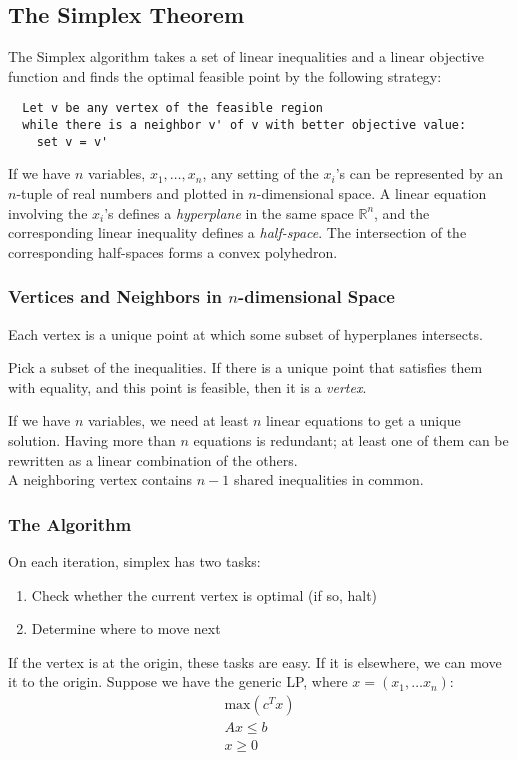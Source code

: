 \subsection{The Simplex Theorem}
The Simplex algorithm takes a set of linear inequalities and a linear objective function and finds the optimal feasible point by the following strategy:
\begin{verbatim}
  Let v be any vertex of the feasible region
  while there is a neighbor v' of v with better objective value:
    set v = v'
\end{verbatim}
If we have $n$ variables, $x_1,\ldots,x_n$, any setting of the $x_i$'s can be represented by an $n$-tuple of real numbers and plotted in $n$-dimensional space.
A linear equation involving the $x_i$'s defines a \textit{hyperplane} in the same space $\mathbb{R}^n$, and the corresponding linear inequality defines a \textit{half-space}.
The intersection of the corresponding half-spaces forms a convex polyhedron.

\subsubsection{Vertices and Neighbors in $n$-dimensional Space}
Each vertex is a unique point at which some subset of hyperplanes intersects.
\begin{definition}[LP Vertex]
  Pick a subset of the inequalities.
  If there is a unique point that satisfies them with equality, and this point is feasible, then it is a \textit{vertex}.
\end{definition}
If we have $n$ variables, we need at least $n$ linear equations to get a unique solution.
Having more than $n$ equations is redundant; at least one of them can be rewritten as a linear combination of the others.\\
A neighboring vertex contains $n-1$ shared inequalities in common.

\subsubsection{The Algorithm}
On each iteration, simplex has two tasks:
\begin{enumerate}
  \item Check whether the current vertex is optimal (if so, halt)
  \item Determine where to move next
\end{enumerate}
If the vertex is at the origin, these tasks are easy.
If it is elsewhere, we can move it to the origin.
Suppose we have the generic LP, where $x = (x_1,\ldots x_n)$:
\begin{align*}
  \text{max}(c^T x)\\
  Ax \leq b\\
  x \geq 0
\end{align*}

